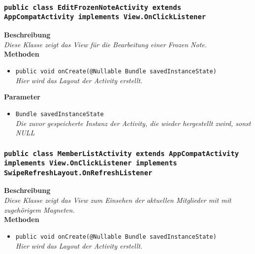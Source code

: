                 
        \subsubsection{\texttt{public class EditFrozenNoteActivity extends AppCompatActivity implements View.OnClickListener}}
               
               	\textbf{Beschreibung} \\
      	        \textit{Diese Klasse zeigt das View für die Bearbeitung einer Frozen Note.} \\
                
                \textbf{Methoden}
                \begin{itemize}
        		\item\texttt{{public void onCreate(@Nullable Bundle savedInstanceState)}}\\
                \textit{Hier wird das Layout der Activity erstellt.}\\
                \end{itemize}
                
                \textbf{Parameter}
                \begin{itemize}
        		\item\texttt{Bundle savedInstanceState}\\ 
                \textit{Die zuvor gespeicherte Instanz der Activity, die wieder hergestellt zwird, sonst NULL}\\
                \end{itemize} 
                
        \subsubsection{\texttt{public class MemberListActivity extends AppCompatActivity implements View.OnClickListener implements SwipeRefreshLayout.OnRefreshListener}}
               
               	\textbf{Beschreibung} \\
      	        \textit{Diese Klasse zeigt das View zum Einsehen der aktuellen Mitglieder mit
 mit zugehörigem Magneten.} \\
                
                \textbf{Methoden}
                \begin{itemize}
        		\item\texttt{{public void onCreate(@Nullable Bundle savedInstanceState)}}\\
                \textit{Hier wird das Layout der Activity erstellt.}\\
                \end{itemize}
                
